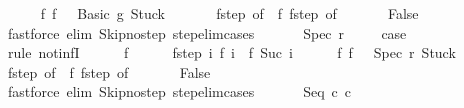 \begin{isabellebody}
\ \ \ \ \isamarkupfalse%
\ f{\isacharunderscore}{}{\isacharcolon}\ {\isachardoublequoteopen}f\ {}\ {\isacharequal}\ {\isacharparenleft}Basic\ g{\isacharcomma}\ Stuck{\isacharparenright}{\isachardoublequoteclose}\ \isanewline
\ \ \ \ \isamarkupfalse%
\ f{\isacharunderscore}step\ {\isacharbrackleft}of\ {}{\isacharbrackright}\ f{\isacharunderscore}{}\ f{\isacharunderscore}step\ {\isacharbrackleft}of\ {}{\isacharbrackright}\isanewline
\ \ \ \ \isamarkupfalse%
\ False\isanewline
\ \ \ \ \ \ \isamarkupfalse%
\ {\isacharparenleft}fastforce\ elim{\isacharcolon}\ Skip{\isacharunderscore}no{\isacharunderscore}step\ step{\isacharunderscore}elim{\isacharunderscore}cases{\isacharparenright}\isanewline
\ \ \isamarkupfalse%
\isanewline
{}\isamarkupfalse%
\isanewline
\ \ \isamarkupfalse%
\ {\isacharparenleft}Spec\ r{\isacharparenright}\ \isanewline
\ \ \isamarkupfalse%
\ {\isacharquery}case\ \isanewline
\ \ \isamarkupfalse%
\ {\isacharparenleft}rule\ not{\isacharunderscore}infI{\isacharparenright}\isanewline
\ \ \ \ \isamarkupfalse%
\ f\isanewline
\ \ \ \ \isamarkupfalse%
\ f{\isacharunderscore}step{\isacharcolon}\ {\isachardoublequoteopen}{\isasymAnd}i{\isachardot}\ {\isasymGamma}{\isasymturnstile}f\ i\ {\isasymrightarrow}\ f\ {\isacharparenleft}Suc\ i{\isacharparenright}{\isachardoublequoteclose}\isanewline
\ \ \ \ \isamarkupfalse%
\ f{\isacharunderscore}{}{\isacharcolon}\ {\isachardoublequoteopen}f\ {}\ {\isacharequal}\ {\isacharparenleft}Spec\ r{\isacharcomma}\ Stuck{\isacharparenright}{\isachardoublequoteclose}\ \isanewline
\ \ \ \ \isamarkupfalse%
\ f{\isacharunderscore}step\ {\isacharbrackleft}of\ {}{\isacharbrackright}\ f{\isacharunderscore}{}\ f{\isacharunderscore}step\ {\isacharbrackleft}of\ {}{\isacharbrackright}\isanewline
\ \ \ \ \isamarkupfalse%
\ False\isanewline
\ \ \ \ \ \ \isamarkupfalse%
\ {\isacharparenleft}fastforce\ elim{\isacharcolon}\ Skip{\isacharunderscore}no{\isacharunderscore}step\ step{\isacharunderscore}elim{\isacharunderscore}cases{\isacharparenright}\isanewline
\ \ \isamarkupfalse%
\isanewline
{}\isamarkupfalse%
\isanewline
\ \ \isamarkupfalse%
\ {\isacharparenleft}Seq\ c\ c\isanewline

\end{isabellebody}
